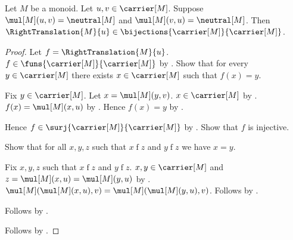 \begin{theorem}\label{monoid_unit_right_translation_bijection}
    Let $M$ be a monoid.
    Let $u,v\in\carrier[M]$.
    Suppose $\mul[M](u,v)=\neutral[M]$ and
        $\mul[M](v,u)=\neutral[M]$.
    Then $\RightTranslation{M}{u}\in
        \bijections{\carrier[M]}{\carrier[M]}$.
\end{theorem}
\begin{proof}
    Let $f=\RightTranslation{M}{u}$.
    $f\in\funs{\carrier[M]}{\carrier[M]}$
        by .
    Show that for every $y\in\carrier[M]$ there exists
        $x\in\carrier[M]$ such that $f(x)=y$.
    \begin{subproof}
        Fix $y\in\carrier[M]$.
        Let $x=\mul[M](y,v)$.
        $x\in\carrier[M]$ by .
        $f(x)=\mul[M](x,u)$ by .
        Hence $f(x)=y$ by
            .
    \end{subproof}
    Hence $f\in\surj{\carrier[M]}{\carrier[M]}$ by .
    Show that $f$ is injective.
    \begin{subproof}
        Show that for all $x,y,z$ such that $x\mathrel{f}z$ and
            $y\mathrel{f}z$ we have $x=y$.
        \begin{subproof}
            Fix $x,y,z$ such that $x\mathrel{f}z$ and $y\mathrel{f}z$.
            $x,y\in\carrier[M]$ and
                $z=\mul[M](x,u)=\mul[M](y,u)$
                by .
            $\mul[M](\mul[M](x,u),v)
                =\mul[M](\mul[M](y,u),v)$.
            Follows by
                .
        \end{subproof}
        Follows by .
    \end{subproof}
    Follows by .
\end{proof}

